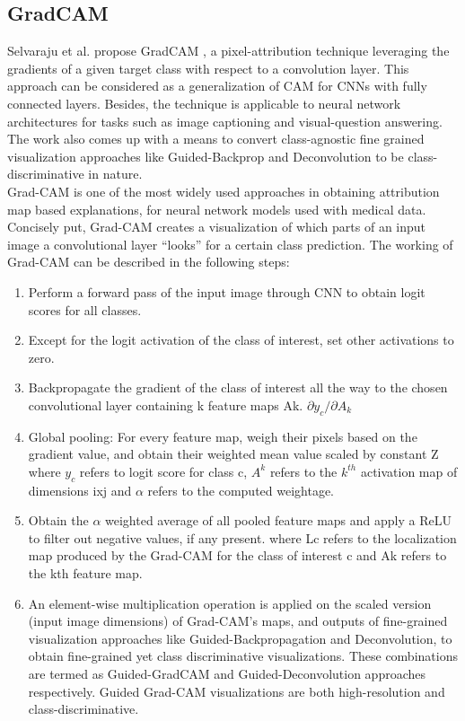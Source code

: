 \documentclass[../report.tex]{subfiles}
\begin{document}
\subsection{GradCAM}
\label{sec_gradcam}
Selvaraju et al. propose GradCAM \cite{selvaraju2017grad}, a pixel-attribution technique leveraging the gradients of a given target class with respect to a convolution layer. This approach can be considered as a generalization of CAM for CNNs with fully connected layers. Besides, the technique is applicable to neural network architectures for tasks such as image captioning and visual-question answering. The work also comes up with a means to convert class-agnostic fine grained visualization approaches like Guided-Backprop and Deconvolution to be class-discriminative in nature.\\
Grad-CAM is one of the most widely used approaches in obtaining attribution map based explanations, for neural network models used with medical data. Concisely put, Grad-CAM creates a visualization of which parts of an input image a convolutional layer “looks” for a certain class prediction. The working of Grad-CAM can be described in the following steps:
\begin{enumerate}
	\item Perform a forward pass of the input image through CNN to obtain logit scores for all classes.
	\item  Except for the logit activation of the class of interest, set other activations to zero.
	\item Backpropagate the gradient of the class of interest all the way to the chosen convolutional layer containing k feature maps Ak. $\partial y_c /\partial A_k$
	\item Global pooling: For every feature map, weigh their pixels based on the gradient value, and obtain their weighted mean value scaled by constant Z
	where $y_c$ refers to logit score for class c, $A^k$ refers to the $k^{th}$ activation map of dimensions ixj and $\alpha$ refers to the computed weightage.
	\item Obtain the $\alpha$ weighted average of all pooled feature maps and apply a ReLU to filter out negative values, if any present.
	where Lc refers to the localization map produced by the Grad-CAM for the class of interest c and Ak refers to the kth feature map.
	\item An element-wise multiplication operation is applied on the scaled version (input image dimensions) of Grad-CAM’s maps, and outputs of fine-grained visualization approaches like Guided-Backpropagation and Deconvolution, to obtain fine-grained yet class discriminative visualizations. These combinations are termed as Guided-GradCAM and Guided-Deconvolution approaches respectively. Guided Grad-CAM visualizations are both high-resolution and class-discriminative.
\end{enumerate}
	
\end{document}
